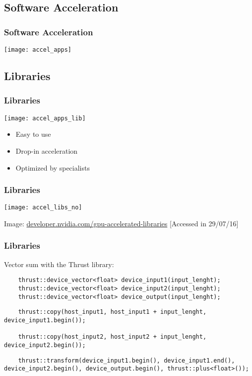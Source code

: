 \documentclass[10pt, compress]{beamer}
\begin{document}
\subsection{Software Acceleration}

\begin{frame}
    \frametitle{Software Acceleration}
    \centering
    \texttt{[image: accel\_apps]}
\end{frame}

\subsection{Libraries}

\begin{frame}
    \frametitle{Libraries}
    \begin{center}
        \texttt{[image: accel\_apps\_lib]}
    \end{center}
    \pause

    \begin{itemize}
        \item Easy to use
            \pause
        \item \alert{Drop-in} acceleration
            \pause
        \item Optimized by specialists
    \end{itemize}
\end{frame}

\begin{frame}
    \frametitle{Libraries}
    \centering
    \texttt{[image: accel\_libs\_no]}
    \vfill

    \tiny{Image: \url{developer.nvidia.com/gpu-accelerated-libraries} [Accessed in 29/07/16]}
\end{frame}

\begin{frame}[fragile]
    \frametitle{Libraries}
    Vector sum with the \alert{Thrust} library:
    \begin{lstlisting}
    thrust::device_vector<float> device_input1(input_lenght);
    thrust::device_vector<float> device_input2(input_lenght);
    thrust::device_vector<float> device_output(input_lenght);
    \end{lstlisting}
    \pause
    \begin{lstlisting}
    thrust::copy(host_input1, host_input1 + input_lenght, device_input1.begin());

    thrust::copy(host_input2, host_input2 + input_lenght, device_input2.begin());
    \end{lstlisting}
    \pause
    \begin{lstlisting}
    thrust::transform(device_input1.begin(), device_input1.end(), device_input2.begin(), device_output.begin(), thrust::plus<float>());
    \end{lstlisting}
\end{frame}
\end{document}

